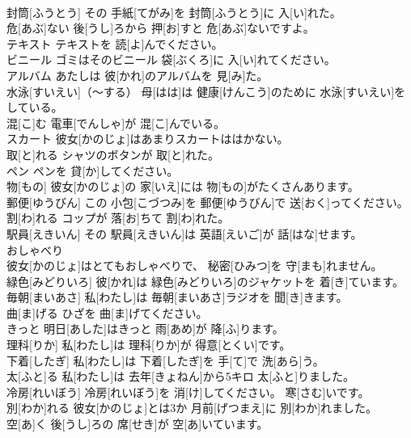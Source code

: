 \documentclass[8pt]{extreport}
\begin{document}
\begin{CJK}{UTF8}{min}
\\	封筒[ふうとう]	その 手紙[てがみ]を 封筒[ふうとう]に 入[い]れた。		
\\	危[あぶ]ない	後[うし]ろから 押[お]すと 危[あぶ]ないですよ。		
\\	テキスト	テキストを 読[よ]んでください。		
\\	ビニール	ゴミはそのビニール 袋[ぶくろ]に 入[い]れてください。		
\\	アルバム	あたしは 彼[かれ]のアルバムを 見[み]た。		
\\	水泳[すいえい]（～する）	母[はは]は 健康[けんこう]のために 水泳[すいえい]をしている。		
\\	混[こ]む	電車[でんしゃ]が 混[こ]んでいる。		
\\	スカート	彼女[かのじょ]はあまりスカートははかない。		
\\	取[と]れる	シャツのボタンが 取[と]れた。		
\\	ペン	ペンを 貸[か]してください。		
\\	物[もの]	彼女[かのじょ]の 家[いえ]には 物[もの]がたくさんあります。		
\\	郵便[ゆうびん]	この 小包[こづつみ]を 郵便[ゆうびん]で 送[おく]ってください。		
\\	割[わ]れる	コップが 落[お]ちて 割[わ]れた。		
\\	駅員[えきいん]	その 駅員[えきいん]は 英語[えいご]が 話[はな]せます。		
\\	おしゃべり 
\\	彼女[かのじょ]はとてもおしゃべりで、 秘密[ひみつ]を 守[まも]れません。		
\\	緑色[みどりいろ]	彼[かれ]は 緑色[みどりいろ]のジャケットを 着[き]ています。		
\\	毎朝[まいあさ]	私[わたし]は 毎朝[まいあさ]ラジオを 聞[き]きます。		
\\	曲[ま]げる	ひざを 曲[ま]げてください。		
\\	きっと	明日[あした]はきっと 雨[あめ]が 降[ふ]ります。		
\\	理科[りか]	私[わたし]は 理科[りか]が 得意[とくい]です。		
\\	下着[したぎ]	私[わたし]は 下着[したぎ]を 手[て]で 洗[あら]う。		
\\	太[ふと]る	私[わたし]は 去年[きょねん]から5キロ 太[ふと]りました。		
\\	冷房[れいぼう]	冷房[れいぼう]を 消[け]してください。 寒[さむ]いです。		
\\	別[わか]れる	彼女[かのじょ]とは3か 月前[げつまえ]に 別[わか]れました。		
\\	空[あ]く	後[うし]ろの 席[せき]が 空[あ]いています。		

\end{CJK}
\end{document}
